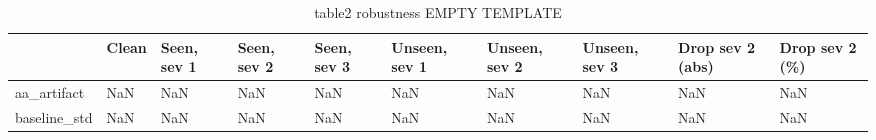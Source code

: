 \begin{table}
\caption{table2 robustness EMPTY TEMPLATE}
\label{tab:table2_robustness_EMPTY_TEMPLATE}
\begin{tabular}{llllllllll}
\toprule
 & Clean & Seen, sev 1 & Seen, sev 2 & Seen, sev 3 & Unseen, sev 1 & Unseen, sev 2 & Unseen, sev 3 & Drop sev 2 (abs) & Drop sev 2 (\%) \\
\midrule
aa\_artifact & NaN & NaN & NaN & NaN & NaN & NaN & NaN & NaN & NaN \\
baseline\_std & NaN & NaN & NaN & NaN & NaN & NaN & NaN & NaN & NaN \\
\bottomrule
\end{tabular}
\end{table}
